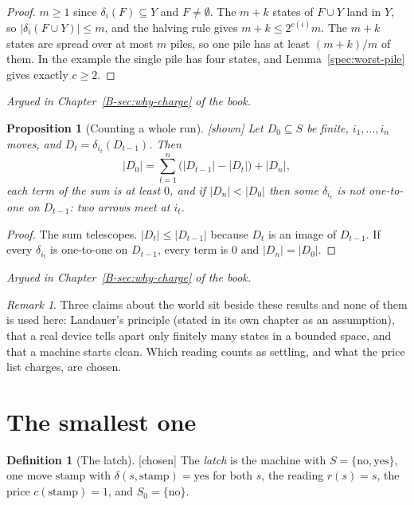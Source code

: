 \documentclass[11pt, a4paper]{article}
\theoremstyle{plain}
\newtheorem{proposition}[theorem]{Proposition}
\theoremstyle{definition}
\newtheorem{definition}[theorem]{Definition}
\theoremstyle{remark}
\newtheorem{remark}[theorem]{Remark}
\newcommand{\Bool}{\{\mathrm{no},\mathrm{yes}\}}
\newcommand{\step}{\delta}
\newcommand{\cost}{c}
\newcommand{\rd}{r}
\newcommand{\argued}[1]{\par\noindent\textit{Argued in Chapter~\ref{B-#1} of the book.}\par}
\newcommand{\kind}[1]{\textup{[#1]}}
\begin{document}
\begin{proof}
$m\ge1$ since $\step_i(F)\subseteq Y$ and $F\neq\emptyset$. The $m+k$ states of $F\cup Y$ land in $Y$, so
$|\step_i(F\cup Y)|\le m$, and the halving rule gives $m+k\le2^{\cost(i)}m$. The $m+k$ states are spread
over at most $m$ piles, so one pile has at least $(m+k)/m$ of them. In the example the single pile has
four states, and Lemma~\ref{spec:worst-pile} gives exactly $\cost\ge2$.
\end{proof}

\argued{sec:why-charge}

\begin{proposition}[Counting a whole run]\label{spec:run-count} \kind{shown}
Let $D_0\subseteq S$ be finite, $i_1,\dots,i_n$ moves, and $D_t=\step_{i_t}(D_{t-1})$. Then
\[
|D_0|=\sum_{t=1}^{n}\bigl(|D_{t-1}|-|D_t|\bigr)+|D_n|,
\]
each term of the sum is at least $0$, and if $|D_n|<|D_0|$ then some $\step_{i_t}$ is not one-to-one on
$D_{t-1}$: two arrows meet at $i_t$.
\end{proposition}

\begin{proof}
The sum telescopes. $|D_t|\le|D_{t-1}|$ because $D_t$ is an image of $D_{t-1}$. If every $\step_{i_t}$ is
one-to-one on $D_{t-1}$, every term is $0$ and $|D_n|=|D_0|$.
\end{proof}

\argued{sec:why-charge}

\begin{remark}
Three claims about the world sit beside these results and none of them is used here: Landauer's
principle (stated in its own chapter as an assumption), that a real device tells apart only finitely
many states in a bounded space, and that a machine starts clean. Which reading counts as settling, and
what the price list charges, are chosen.
\end{remark}

\section{The smallest one}\label{spec:ch04}

\begin{definition}[The latch]\label{spec:latch} \kind{chosen}
The \emph{latch} is the machine with $S=\Bool$, one move $\mathrm{stamp}$ with
$\step(s,\mathrm{stamp})=\mathrm{yes}$ for both $s$, the reading $\rd(s)=s$, the price
$\cost(\mathrm{stamp})=1$, and $S_0=\{\mathrm{no}\}$.
\end{definition}
\end{document}
